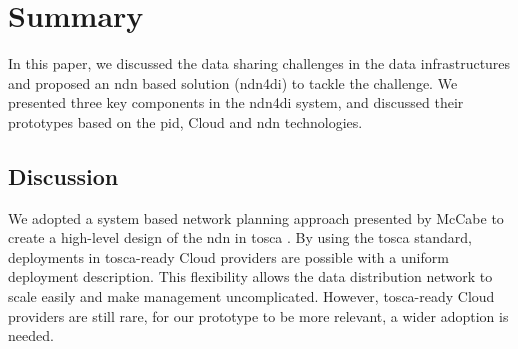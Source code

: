 \documentclass[conference]{IEEEtran}
\begin{document}
\section{Summary}
In this paper, we discussed the data sharing challenges in the data infrastructures and proposed an \gls{ndn} based solution (\gls{ndn4di}) to tackle the challenge. We presented three key components in the \gls{ndn4di} system, and discussed their prototypes based on the \gls{pid}, Cloud and \gls{ndn} technologies. 

\subsection{Discussion}

We adopted a system based network planning approach presented by McCabe to create a high-level design of the \gls{ndn} in \gls{tosca} \cite{mccabe2010network}. By using the \gls{tosca} standard, deployments in \gls{tosca}-ready Cloud providers are possible with a uniform deployment description. This flexibility allows the data distribution network to scale easily and make management uncomplicated. However, \gls{tosca}-ready Cloud providers are still rare, for our prototype to be more relevant, a wider adoption is needed.

\end{document}
